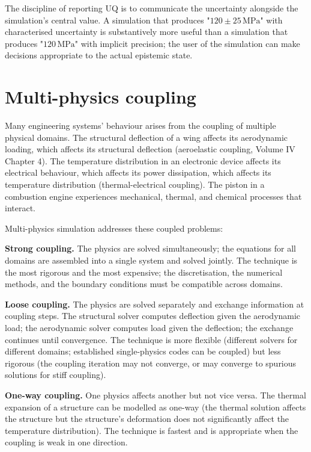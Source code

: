 The discipline of reporting UQ is to communicate the uncertainty alongside the simulation's central value. A simulation that produces "$120 \pm 25\,\text{MPa}$" with characterised uncertainty is substantively more useful than a simulation that produces "$120\,\text{MPa}$" with implicit precision; the user of the simulation can make decisions appropriate to the actual epistemic state.

\section{Multi-physics coupling}

Many engineering systems' behaviour arises from the coupling of multiple physical domains. The structural deflection of a wing affects its aerodynamic loading, which affects its structural deflection (aeroelastic coupling, Volume IV Chapter 4). The temperature distribution in an electronic device affects its electrical behaviour, which affects its power dissipation, which affects its temperature distribution (thermal-electrical coupling). The piston in a combustion engine experiences mechanical, thermal, and chemical processes that interact.

Multi-physics simulation addresses these coupled problems:

\textbf{Strong coupling.} The physics are solved simultaneously; the equations for all domains are assembled into a single system and solved jointly. The technique is the most rigorous and the most expensive; the discretisation, the numerical methods, and the boundary conditions must be compatible across domains.

\textbf{Loose coupling.} The physics are solved separately and exchange information at coupling steps. The structural solver computes deflection given the aerodynamic load; the aerodynamic solver computes load given the deflection; the exchange continues until convergence. The technique is more flexible (different solvers for different domains; established single-physics codes can be coupled) but less rigorous (the coupling iteration may not converge, or may converge to spurious solutions for stiff coupling).

\textbf{One-way coupling.} One physics affects another but not vice versa. The thermal expansion of a structure can be modelled as one-way (the thermal solution affects the structure but the structure's deformation does not significantly affect the temperature distribution). The technique is fastest and is appropriate when the coupling is weak in one direction.

